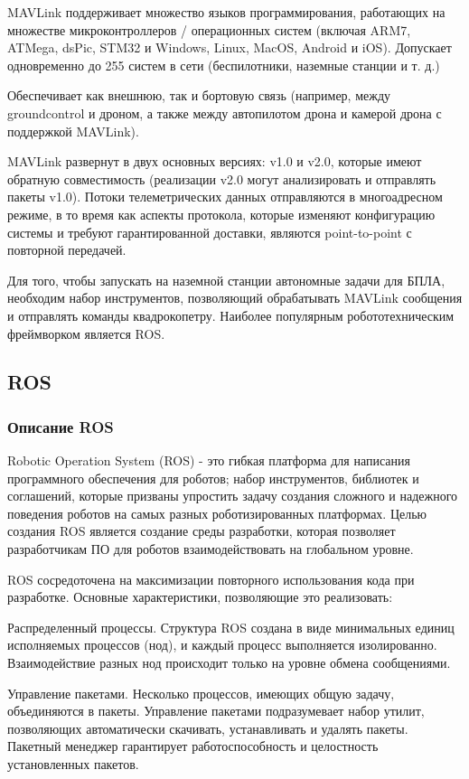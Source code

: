 MAVLink поддерживает множество языков программирования, работающих на множестве микроконтроллеров / операционных систем (включая ARM7, ATMega, dsPic, STM32 и Windows, Linux, MacOS, Android и iOS). Допускает одновременно до 255 систем в сети (беспилотники, наземные станции и т. д.)

Обеспечивает как внешнюю, так и бортовую связь (например, между groundcontrol и дроном, а также между автопилотом дрона и камерой дрона с поддержкой MAVLink).
\cite{mavlink}

MAVLink развернут в двух основных версиях: v1.0 и v2.0, которые имеют обратную совместимость (реализации v2.0 могут анализировать и отправлять пакеты v1.0). Потоки телеметрических данных отправляются в многоадресном режиме, в то время как аспекты протокола, которые изменяют конфигурацию системы и требуют гарантированной доставки, являются point-to-point с повторной передачей.


Для того, чтобы запускать на наземной станции автономные задачи для БПЛА, необходим набор инструментов, позволяющий обрабатывать MAVLink сообщения и отправлять команды квадрокопетру. Наиболее популярным робототехническим фреймворком является ROS.
\subsection{ROS}
\subsubsection{Описание ROS}
Robotic Operation System (ROS) - это гибкая платформа для написания программного обеспечения для роботов; набор инструментов, библиотек и соглашений, которые призваны упростить задачу создания сложного и надежного поведения роботов на самых разных роботизированных платформах.
\cite{ros}
Целью создания ROS является создание среды разработки, которая позволяет разработчикам ПО для роботов взаимодействовать на глобальном уровне.

ROS сосредоточена на максимизации повторного использования кода при разработке. Основные характеристики, позволяющие это реализовать:

Распределенный процессы. Структура ROS создана в виде минимальных единиц исполняемых процессов (нод), и каждый процесс выполняется изолированно. Взаимодействие разных нод происходит только на уровне обмена сообщениями.

Управление пакетами. Несколько процессов, имеющих общую задачу, объединяются в пакеты. Управление пакетами подразумевает набор утилит, позволяющих автоматически скачивать, устанавливать и удалять пакеты. Пакетный менеджер гарантирует работоспособность и целостность установленных пакетов.

